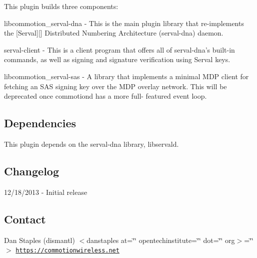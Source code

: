 This plugin builds three components\-:


\begin{DoxyEnumerate}
\item libcommotion\-\_\-serval-\/dna -\/ This is the main plugin library that re-\/implements the \mbox{[}Serval\mbox{]}\mbox{[}\mbox{]} Distributed Numbering Architecture (serval-\/dna) daemon.
\item serval-\/client -\/ This is a client program that offers all of serval-\/dna's built-\/in commands, as well as signing and signature verification using Serval keys.
\item libcommotion\-\_\-serval-\/sas -\/ A library that implements a minimal M\-D\-P client for fetching an S\-A\-S signing key over the M\-D\-P overlay network. This will be deprecated once commotiond has a more full-\/ featured event loop.
\end{DoxyEnumerate}

\subsection*{Dependencies }

This plugin depends on the serval-\/dna library, libservald.

\subsection*{Changelog }

12/18/2013 -\/ Initial release

\subsection*{Contact }

Dan Staples (dismantl) $<$danstaples at=\char`\"{}\char`\"{} opentechinstitute=\char`\"{}\char`\"{} dot=\char`\"{}\char`\"{} org$>$=\char`\"{}\char`\"{}$>$ \href{https://commotionwireless.net}{\tt https\-://commotionwireless.\-net} 
